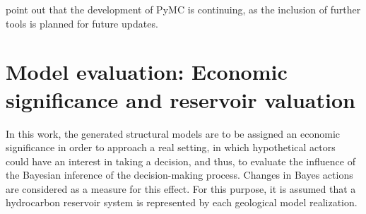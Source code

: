 		\citet{salvatier2016pymc3} point out that the development of PyMC is continuing, as the inclusion of further tools is planned for future updates.
		
        \section{Model evaluation: Economic significance and reservoir valuation}\label{sec:Reservoir_values}
        In this work, the generated structural models are to be assigned an economic significance in order to approach a real setting, in which hypothetical actors could have an interest in taking a decision, and thus, to evaluate the influence of the Bayesian inference of the decision-making process. Changes in Bayes actions are considered as a measure for this effect. For this purpose, it is assumed that a hydrocarbon reservoir system is represented by each geological model realization.
        
